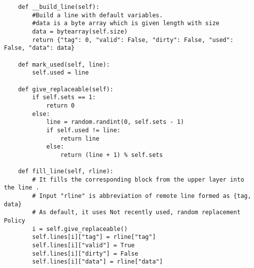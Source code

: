 \begin{verbatim}
    def __build_line(self):
        #Build a line with default variables.
        #data is a byte array which is given length with size
        data = bytearray(self.size)
        return {"tag": 0, "valid": False, "dirty": False, "used": False, "data": data}

    def mark_used(self, line):
        self.used = line

    def give_replaceable(self):
        if self.sets == 1:
            return 0
        else:
            line = random.randint(0, self.sets - 1)
            if self.used != line:
                return line
            else:
                return (line + 1) % self.sets

    def fill_line(self, rline):
        # It fills the corresponding block from the upper layer into the line .
        # Input "rline" is abbreviation of remote line formed as {tag, data}
        # As default, it uses Not recently used, random replacement Policy
        i = self.give_replaceable()
        self.lines[i]["tag"] = rline["tag"]
        self.lines[i]["valid"] = True
        self.lines[i]["dirty"] = False
        self.lines[i]["data"] = rline["data"]
\end{verbatim}